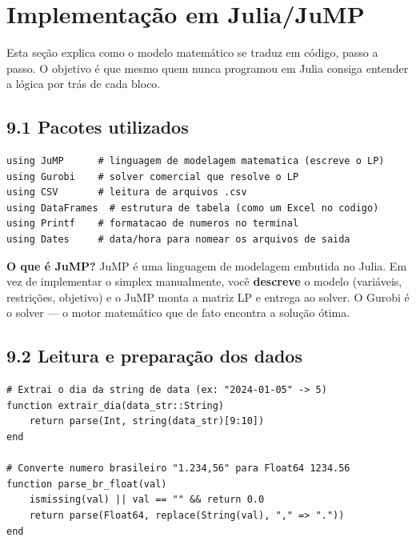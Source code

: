 \documentclass[12pt, a4paper]{article}
\begin{document}
\newpage
\section{Implementa\c{c}\~{a}o em Julia/JuMP}

Esta se\c{c}\~{a}o explica como o modelo matem\'{a}tico se traduz em c\'{o}digo, passo a passo.
O objetivo \'{e} que mesmo quem nunca programou em Julia consiga entender a l\'{o}gica por tr\'{a}s de cada bloco.

\subsection*{9.1 Pacotes utilizados}

\begin{mdframed}[style=codigo]
\begin{lstlisting}
using JuMP      # linguagem de modelagem matematica (escreve o LP)
using Gurobi    # solver comercial que resolve o LP
using CSV       # leitura de arquivos .csv
using DataFrames  # estrutura de tabela (como um Excel no codigo)
using Printf    # formatacao de numeros no terminal
using Dates     # data/hora para nomear os arquivos de saida
\end{lstlisting}
\end{mdframed}

\begin{mdframed}[style=destaque]
\textbf{\color{ballblue}O que \'{e} JuMP?} JuMP \'{e} uma linguagem de modelagem embutida no Julia.
Em vez de implementar o simplex manualmente, voc\^{e} \textbf{descreve} o modelo
(vari\'{a}veis, restri\c{c}\~{o}es, objetivo) e o JuMP monta a matriz LP e entrega ao solver.
O Gurobi \'{e} o solver --- o motor matem\'{a}tico que de fato encontra a solu\c{c}\~{a}o \'{o}tima.
\end{mdframed}

\subsection*{9.2 Leitura e prepara\c{c}\~{a}o dos dados}

\begin{mdframed}[style=codigo]
\begin{lstlisting}
# Extrai o dia da string de data (ex: "2024-01-05" -> 5)
function extrair_dia(data_str::String)
    return parse(Int, string(data_str)[9:10])
end

# Converte numero brasileiro "1.234,56" para Float64 1234.56
function parse_br_float(val)
    ismissing(val) || val == "" && return 0.0
    return parse(Float64, replace(String(val), "," => "."))
end
\end{lstlisting}
\end{mdframed}
\end{document}
